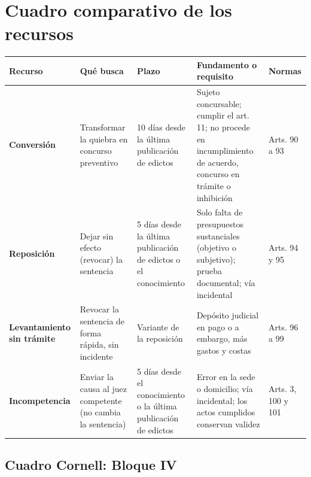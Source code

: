 \documentclass[12pt,oneside]{book}
\begin{document}
\section{Cuadro comparativo de los recursos}

\begin{longtable}{@{}>{\raggedright\arraybackslash}p{} >{\raggedright\arraybackslash}p{} >{\raggedright\arraybackslash}p{} >{\raggedright\arraybackslash}p{} >{\raggedright\arraybackslash}p{}@{}}
\toprule
\textbf{Recurso} & \textbf{Qué busca} & \textbf{Plazo} & \textbf{Fundamento o requisito} & \textbf{Normas} \\
\midrule
\endhead
\small\textbf{Conversión} & \small Transformar la quiebra en concurso preventivo & \small 10 días desde la última publicación de edictos & \small Sujeto concursable; cumplir el art. 11; no procede en incumplimiento de acuerdo, concurso en trámite o inhibición & \small Arts. 90 a 93 \\[0.4em]
\small\textbf{Reposición} & \small Dejar sin efecto (revocar) la sentencia & \small 5 días desde la última publicación de edictos o el conocimiento & \small Solo falta de presupuestos sustanciales (objetivo o subjetivo); prueba documental; vía incidental & \small Arts. 94 y 95 \\[0.4em]
\small\textbf{Levantamiento sin trámite} & \small Revocar la sentencia de forma rápida, sin incidente & \small Variante de la reposición & \small Depósito judicial en pago o a embargo, más gastos y costas & \small Arts. 96 a 99 \\[0.4em]
\small\textbf{Incompetencia} & \small Enviar la causa al juez competente (no cambia la sentencia) & \small 5 días desde el conocimiento o la última publicación de edictos & \small Error en la sede o domicilio; vía incidental; los actos cumplidos conservan validez & \small Arts. 3, 100 y 101 \\
\bottomrule
\end{longtable}

\subsection*{Cuadro Cornell: Bloque IV}
\end{document}
